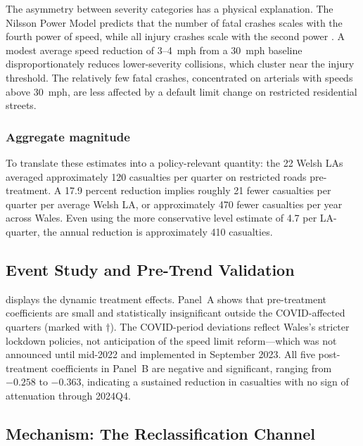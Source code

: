 \documentclass[12pt]{article}
\begin{document}
The asymmetry between severity categories has a physical explanation. The Nilsson Power Model predicts that the number of fatal crashes scales with the fourth power of speed, while all injury crashes scale with the second power \citep{nilsson2004, elvik2009}. A modest average speed reduction of 3--4~mph from a 30~mph baseline disproportionately reduces lower-severity collisions, which cluster near the injury threshold. The relatively few fatal crashes, concentrated on arterials with speeds above 30~mph, are less affected by a default limit change on restricted residential streets.

\subsubsection*{Aggregate magnitude} To translate these estimates into a policy-relevant quantity: the 22 Welsh LAs averaged approximately 120 casualties per quarter on restricted roads pre-treatment. A 17.9 percent reduction implies roughly 21 fewer casualties per quarter per average Welsh LA, or approximately 470 fewer casualties per year across Wales. Even using the more conservative level estimate of 4.7 per LA-quarter, the annual reduction is approximately 410 casualties.

\subsection{Event Study and Pre-Trend Validation}



 displays the dynamic treatment effects. Panel~A shows that pre-treatment coefficients are small and statistically insignificant outside the COVID-affected quarters (marked with $\dagger$). The COVID-period deviations reflect Wales's stricter lockdown policies, not anticipation of the speed limit reform---which was not announced until mid-2022 and implemented in September 2023. All five post-treatment coefficients in Panel~B are negative and significant, ranging from $-0.258$ to $-0.363$, indicating a sustained reduction in casualties with no sign of attenuation through 2024Q4.

\subsection{Mechanism: The Reclassification Channel}


\end{document}
